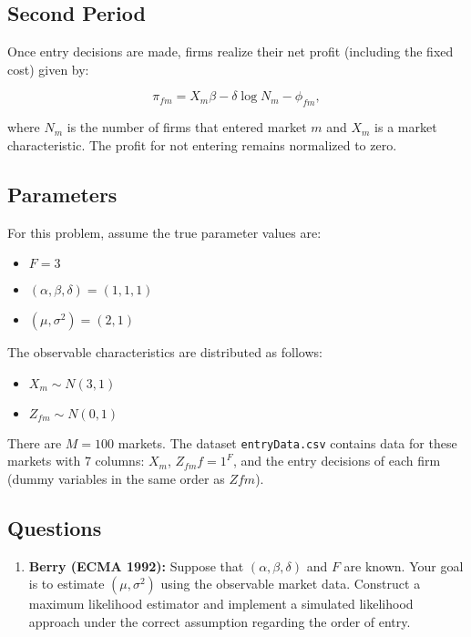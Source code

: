 \documentclass{article}
\begin{document}
\begin{enumerate}
\subsection{Second Period}

Once entry decisions are made, firms realize their net profit (including the fixed cost) given by:

\begin{equation}
\pi_{fm} = X_m \beta - \delta \log N_m - \phi_{fm},
\end{equation}

where $N_m$ is the number of firms that entered market $m$ and $X_m$ is a market characteristic. The profit for not entering remains normalized to zero.

\subsection{Parameters}

For this problem, assume the true parameter values are:
\begin{itemize}
\item $F = 3$
\item $(\alpha, \beta, \delta) = (1, 1, 1)$
\item $(\mu, \sigma^2) = (2, 1)$
\end{itemize}

The observable characteristics are distributed as follows:
\begin{itemize}
\item $X_m \sim N (3, 1)$
\item $Z_{fm} \sim N (0, 1)$
\end{itemize}

There are $M = 100$ markets. The dataset \texttt{entryData.csv} contains data for these markets with 7 columns: $X_m$, ${Z_{fm}}{f=1}^{F}$, and the entry decisions of each firm (dummy variables in the same order as $Z{fm}$).

\subsection{Questions}

\begin{enumerate}
\item \textbf{Berry (ECMA 1992):} Suppose that $(\alpha, \beta, \delta)$ and $F$ are known. Your goal is to estimate $(\mu, \sigma^2)$ using the observable market data. Construct a maximum likelihood estimator and implement a simulated likelihood approach under the correct assumption regarding the order of entry.
\begin{answer}


\end{answer}
\end{enumerate}
\end{enumerate}
\end{document}

